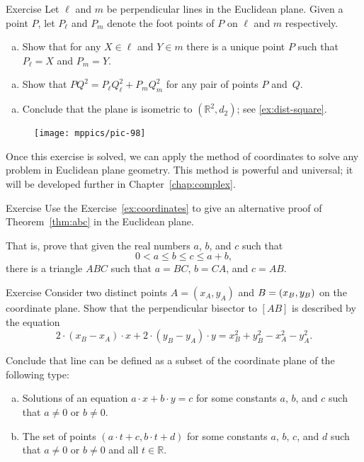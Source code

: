\begin{thm}{Exercise}\label{ex:coordinates} 
Let $\ell$ and $m$ be perpendicular lines in the Euclidean plane.
Given a point $P$, let $P_\ell$ and $P_m$ denote the foot points of $P$ on $\ell$ and $m$ respectively.

\begin{enumerate}[(a)]
\item Show that for any $X\in \ell$ and $Y\in m$ there is a unique point $P$ such that $P_\ell=X$ and $P_m=Y$.
\end{enumerate}

\begin{enumerate}[(a)]\addtocounter{enumi}{1}
\item
Show that 
$PQ^2=P_\ell Q_\ell^2+P_mQ_m^2$
for any pair of points $P$ and~$Q$.
\end{enumerate}

\begin{enumerate}[(a)]\addtocounter{enumi}{2}
\item Conclude that the plane is isometric to $(\mathbb{R}^2,d_2)$; see \ref{ex:dist-square}.
\end{enumerate}

\end{thm}

\begin{wrapfigure}{r}{37mm}
\centering
\texttt{[image: mppics/pic-98]}
\end{wrapfigure}

Once this exercise is solved, we can apply 
the method of coordinates
to solve any problem in Euclidean plane geometry.
This method is powerful and universal;
it will be developed further in Chapter~\ref{chap:complex}.

\begin{thm}{Exercise}\label{ex:abc}
Use the Exercise~\ref{ex:coordinates}
to give an alternative proof of Theorem~\ref{thm:abc} in the Euclidean plane.

That is, prove that given the real numbers $a$, $b$, and $c$ such that 
 $$0<a\le b\le c\le a+b,$$
there is a triangle $ABC$
such that $a=BC$, $b=CA$, and $c=AB$.
\end{thm} 

\begin{thm}{Exercise}\label{ex:line-coord}
Consider two distinct points $A=(x_A,y_A)$ and $B\z=(x_B,y_B)$ on the coordinate plane.
Show that the perpendicular bisector to $[AB]$ is described by the equation
\[2\cdot (x_B-x_A)\cdot x+2\cdot (y_B-y_A)\cdot y=x_B^2+y_B^2-x_A^2-y_A^2.\]

Conclude that line can be defined as a subset of the coordinate plane of the following type:
\begin{enumerate}[(a)]
\item  Solutions of an equation $a\cdot x+b\cdot y=c$
for some constants $a$, $b$, and $c$ such that $a\ne 0$ or $b\ne0$.
\item\label{ex:line-coord:parameter} The set of points $(a\cdot t+c,b\cdot t+d)$ for some constants $a$, $b$, $c$, and $d$ such that $a\ne 0$ or $b\ne0$ and all $t\in \mathbb{R}$.
\end{enumerate}

\end{thm}

